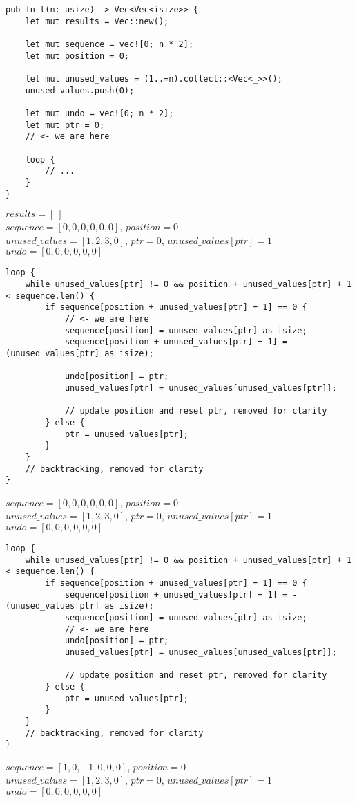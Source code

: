 \begin{frame}[fragile]
    \begin{verbatim}
pub fn l(n: usize) -> Vec<Vec<isize>> {
    let mut results = Vec::new();

    let mut sequence = vec![0; n * 2];
    let mut position = 0;

    let mut unused_values = (1..=n).collect::<Vec<_>>();
    unused_values.push(0);

    let mut undo = vec![0; n * 2];
    let mut ptr = 0;
    // <- we are here

    loop {
        // ...
    }
}
    \end{verbatim}
    $results = [\ ]$\\
    $sequence = [0, 0, 0, 0, 0, 0]$, $position = 0$\\
    $unused\_values = [1, 2, 3, 0]$, $ptr = 0$, $unused\_values[ptr] = 1$\\
    $undo = [0, 0, 0, 0, 0, 0]$
\end{frame}
\begin{frame}[fragile]
    \begin{verbatim}
loop {
    while unused_values[ptr] != 0 && position + unused_values[ptr] + 1 < sequence.len() {
        if sequence[position + unused_values[ptr] + 1] == 0 {
            // <- we are here
            sequence[position] = unused_values[ptr] as isize;
            sequence[position + unused_values[ptr] + 1] = -(unused_values[ptr] as isize);

            undo[position] = ptr;
            unused_values[ptr] = unused_values[unused_values[ptr]];
            
            // update position and reset ptr, removed for clarity
        } else {
            ptr = unused_values[ptr];
        }
    }
    // backtracking, removed for clarity
}
    \end{verbatim}
    $sequence = [0, 0, 0, 0, 0, 0]$, $position = 0$\\
    $unused\_values = [1, 2, 3, 0]$, $ptr = 0$, $unused\_values[ptr] = 1$\\
    $undo = [0, 0, 0, 0, 0, 0]$
\end{frame}
\begin{frame}[fragile]
    \begin{verbatim}
loop {
    while unused_values[ptr] != 0 && position + unused_values[ptr] + 1 < sequence.len() {
        if sequence[position + unused_values[ptr] + 1] == 0 {
            sequence[position + unused_values[ptr] + 1] = -(unused_values[ptr] as isize);
            sequence[position] = unused_values[ptr] as isize;
            // <- we are here
            undo[position] = ptr;
            unused_values[ptr] = unused_values[unused_values[ptr]];
            
            // update position and reset ptr, removed for clarity
        } else {
            ptr = unused_values[ptr];
        }
    }
    // backtracking, removed for clarity
}
    \end{verbatim}
    $sequence = [1, 0, -1, 0, 0, 0]$, $position = 0$\\
    $unused\_values = [1, 2, 3, 0]$, $ptr = 0$, $unused\_values[ptr] = 1$\\
    $undo = [0, 0, 0, 0, 0, 0]$
\end{frame}
